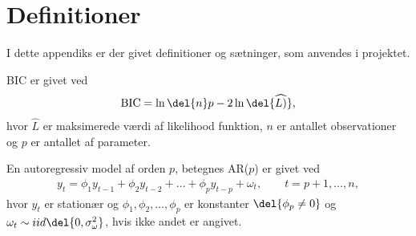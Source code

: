 \chapter{Definitioner}
I dette appendiks er der givet definitioner og sætninger, som anvendes i projektet.

\begin{defn}\label{def:bic}
BIC er givet ved
\begin{align*}
\text{BIC} = \ln\del{n}p - 2 \ln\del{\widehat{L)}}, \label{eq:bic}
\end{align*}
hvor $\widehat{L}$ er maksimerede værdi af likelihood funktion, $n$ er antallet observationer og $p$ er antallet af parameter.
\end{defn} 

\begin{defn} \label{def:ar}
En autoregressiv model af orden $p$, betegnes AR($p$) er givet ved
\begin{align*}
y_t = \phi_1 y_{t-1} + \phi_2 y_{t-2} + \dots + \phi_p y_{t-p} + \omega_t, \qquad t = p+1, \dots, n,  
\end{align*}
hvor $y_t$ er stationær og $\phi_1 , \phi_2, \dots, \phi_p $ er konstanter  $\del{ \phi_p \neq 0}$ og $\omega_t \sim iid\del{0, \sigma_\omega^2}$, hvis ikke andet er angivet.  
\end{defn}